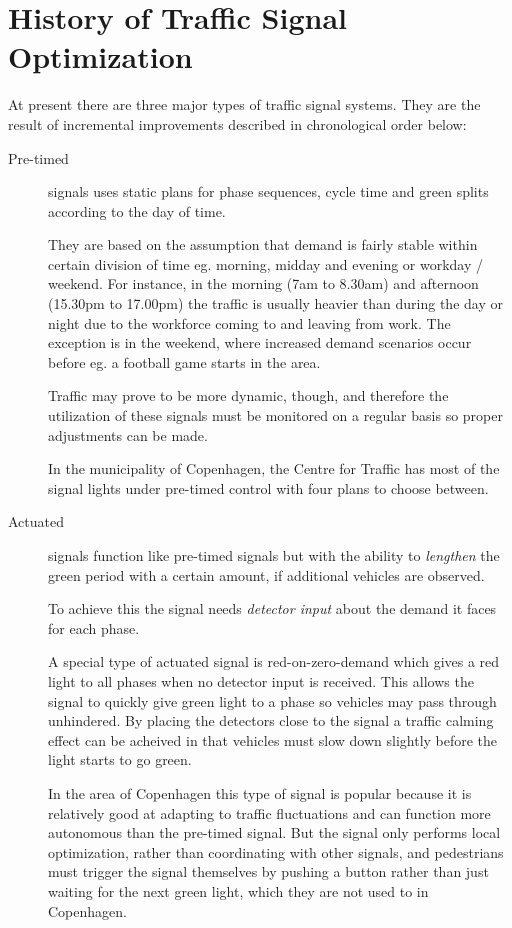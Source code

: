 \section{History of Traffic Signal Optimization}
\label{history}

At present there are three major types of traffic signal systems. They are the result of incremental improvements described in chronological order below:

\begin{description}
\item[Pre-timed] signals uses static plans for phase sequences, cycle time and green splits according to the day of time. 

They are based on the assumption that demand is fairly stable within certain division of time eg. morning, midday and evening or workday / weekend. For instance, in the morning (7am to 8.30am) and afternoon (15.30pm to 17.00pm) the traffic is usually heavier than during the day or night due to the workforce coming to and leaving from work. The exception is in the weekend, where increased demand scenarios occur before eg. a football game starts in the area.

Traffic may prove to be more dynamic, though, and therefore the utilization of these signals must be monitored on a regular basis so proper adjustments can be made.

In the municipality of Copenhagen, the Centre for Traffic has most of the signal lights under pre-timed control with four plans to choose between.
\item[Actuated] signals function like pre-timed signals but with the ability to \textit{lengthen} the green period with a certain amount, if additional vehicles are observed. 

To achieve this the signal needs \textit{detector input} about the demand it faces for each phase.

A special type of actuated signal is red-on-zero-demand which gives a red light to all phases when no detector input is received. This allows the signal to quickly give green light to a phase  so vehicles may pass through unhindered. By placing the detectors close to the signal a traffic calming effect can be acheived in that vehicles must slow down slightly before the light starts to go green.

In the area of Copenhagen this type of signal is popular because it is relatively good at adapting to traffic fluctuations and can function more autonomous than the pre-timed signal. But the signal only performs local optimization, rather than coordinating with other signals, and pedestrians must trigger the signal themselves by pushing a button rather than just waiting for the next green light, which they are not used to in Copenhagen.


\end{description}
